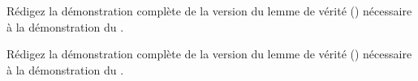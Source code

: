 \documentclass[../../../include/open-logic-section]{subfiles}
\begin{document}
\begin{prob}
Rédigez la démonstration complète de la version du lemme de vérité
() nécessaire à la démonstration du
.
\end{prob}
\tagendprob

\begin{prob}
Rédigez la démonstration complète de la version du lemme de vérité
() nécessaire à la démonstration du
.
\end{prob}
\tagendprob
\end{document}
